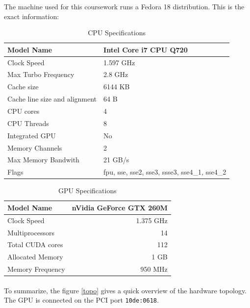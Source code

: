 \documentclass[fleqn,11pt]{SelfArx} %
\begin{document}
The machine used for this coursework runs a Fedora 18 distribution. This is the exact information:

\begin{table}[!h]
	\centering

	\begin{tabular}{|p{3.5cm}|p{4cm}|}
		\hline
		Model Name & Intel Core i7 CPU Q720 \\
		\hline
		Clock Speed & 1.597 GHz \\
		\hline
		Max Turbo Frequency & 2.8 GHz \\
		\hline
		Cache size & 6144 KB \\
		\hline
		Cache line size and alignment & 64 B \\
		\hline
		CPU cores & 4 \\
		\hline
		CPU Threads & 8 \\
		\hline
		Integrated GPU & No \\
		\hline
		Memory Channels & 2 \\
		\hline
		Max Memory Bandwith & 21 GB/s \\
		\hline
		Flags & fpu, sse, sse2, sse3, ssse3, sse4\_1, sse4\_2 \\
		\hline
	\end{tabular}

	\caption{CPU Specifications}
	\label{CPUspec}
\end{table}

\begin{table}[h]
	\centering

	\begin{tabular}{|l|r|}
		\hline
		Model Name & nVidia GeForce GTX 260M \\
		\hline
		Clock Speed & 1.375 GHz \\
		\hline
		Multiprocessors & 14 \\
		\hline
		Total CUDA cores & 112 \\
		\hline
		Allocated Memory & 1 GB \\
		\hline
		Memory Frequency & 950 MHz \\
		\hline
	\end{tabular}

	\caption{GPU Specifications}
	\label{GPUspecs}
\end{table}

\paragraph{}
To summarize, the figure \ref{topo} gives a quick overview of the hardware topology. The GPU is connected on the PCI port \verb+10de:0618+.
\end{document}
